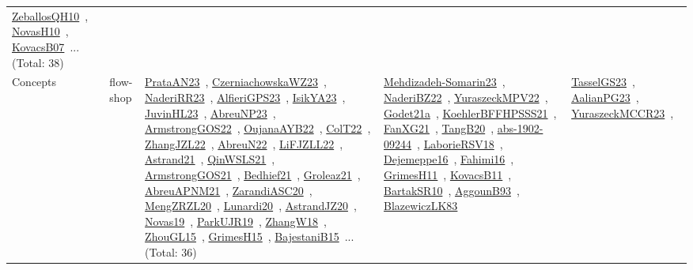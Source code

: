 {\begin{longtable}{lp{3cm}>{\raggedright\arraybackslash}p{6cm}>{\raggedright\arraybackslash}p{6cm}>{\raggedright\arraybackslash}p{8cm}}
\href{works/ZeballosQH10.pdf}{ZeballosQH10}~\cite{ZeballosQH10}, \href{works/NovasH10.pdf}{NovasH10}~\cite{NovasH10}, \href{works/KovacsB07.pdf}{KovacsB07}~\cite{KovacsB07}... (Total: 38)\\
Concepts & flow-shop & \href{works/PrataAN23.pdf}{PrataAN23}~\cite{PrataAN23}, \href{works/CzerniachowskaWZ23.pdf}{CzerniachowskaWZ23}~\cite{CzerniachowskaWZ23}, \href{works/NaderiRR23.pdf}{NaderiRR23}~\cite{NaderiRR23}, \href{works/AlfieriGPS23.pdf}{AlfieriGPS23}~\cite{AlfieriGPS23}, \href{works/IsikYA23.pdf}{IsikYA23}~\cite{IsikYA23}, \href{works/JuvinHL23.pdf}{JuvinHL23}~\cite{JuvinHL23}, \href{works/AbreuNP23.pdf}{AbreuNP23}~\cite{AbreuNP23}, \href{works/ArmstrongGOS22.pdf}{ArmstrongGOS22}~\cite{ArmstrongGOS22}, \href{works/OujanaAYB22.pdf}{OujanaAYB22}~\cite{OujanaAYB22}, \href{works/ColT22.pdf}{ColT22}~\cite{ColT22}, \href{works/ZhangJZL22.pdf}{ZhangJZL22}~\cite{ZhangJZL22}, \href{works/AbreuN22.pdf}{AbreuN22}~\cite{AbreuN22}, \href{works/LiFJZLL22.pdf}{LiFJZLL22}~\cite{LiFJZLL22}, \href{works/Astrand21.pdf}{Astrand21}~\cite{Astrand21}, \href{works/QinWSLS21.pdf}{QinWSLS21}~\cite{QinWSLS21}, \href{works/ArmstrongGOS21.pdf}{ArmstrongGOS21}~\cite{ArmstrongGOS21}, \href{works/Bedhief21.pdf}{Bedhief21}~\cite{Bedhief21}, \href{works/Groleaz21.pdf}{Groleaz21}~\cite{Groleaz21}, \href{works/AbreuAPNM21.pdf}{AbreuAPNM21}~\cite{AbreuAPNM21}, \href{works/ZarandiASC20.pdf}{ZarandiASC20}~\cite{ZarandiASC20}, \href{works/MengZRZL20.pdf}{MengZRZL20}~\cite{MengZRZL20}, \href{works/Lunardi20.pdf}{Lunardi20}~\cite{Lunardi20}, \href{works/AstrandJZ20.pdf}{AstrandJZ20}~\cite{AstrandJZ20}, \href{works/Novas19.pdf}{Novas19}~\cite{Novas19}, \href{works/ParkUJR19.pdf}{ParkUJR19}~\cite{ParkUJR19}, \href{works/ZhangW18.pdf}{ZhangW18}~\cite{ZhangW18}, \href{works/ZhouGL15.pdf}{ZhouGL15}~\cite{ZhouGL15}, \href{works/GrimesH15.pdf}{GrimesH15}~\cite{GrimesH15}, \href{works/BajestaniB15.pdf}{BajestaniB15}~\cite{BajestaniB15}... (Total: 36) & \href{works/Mehdizadeh-Somarin23.pdf}{Mehdizadeh-Somarin23}~\cite{Mehdizadeh-Somarin23}, \href{works/NaderiBZ22.pdf}{NaderiBZ22}~\cite{NaderiBZ22}, \href{works/YuraszeckMPV22.pdf}{YuraszeckMPV22}~\cite{YuraszeckMPV22}, \href{works/Godet21a.pdf}{Godet21a}~\cite{Godet21a}, \href{works/KoehlerBFFHPSSS21.pdf}{KoehlerBFFHPSSS21}~\cite{KoehlerBFFHPSSS21}, \href{works/FanXG21.pdf}{FanXG21}~\cite{FanXG21}, \href{works/TangB20.pdf}{TangB20}~\cite{TangB20}, \href{works/abs-1902-09244.pdf}{abs-1902-09244}~\cite{abs-1902-09244}, \href{works/LaborieRSV18.pdf}{LaborieRSV18}~\cite{LaborieRSV18}, \href{works/Dejemeppe16.pdf}{Dejemeppe16}~\cite{Dejemeppe16}, \href{works/Fahimi16.pdf}{Fahimi16}~\cite{Fahimi16}, \href{works/GrimesH11.pdf}{GrimesH11}~\cite{GrimesH11}, \href{works/KovacsB11.pdf}{KovacsB11}~\cite{KovacsB11}, \href{works/BartakSR10.pdf}{BartakSR10}~\cite{BartakSR10}, \href{works/AggounB93.pdf}{AggounB93}~\cite{AggounB93}, \href{works/BlazewiczLK83.pdf}{BlazewiczLK83}~\cite{BlazewiczLK83} & \href{works/TasselGS23.pdf}{TasselGS23}~\cite{TasselGS23}, \href{works/AalianPG23.pdf}{AalianPG23}~\cite{AalianPG23}, \href{works/YuraszeckMCCR23.pdf}{YuraszeckMCCR23}~\cite{YuraszeckMCCR23}, 
\end{longtable}}
